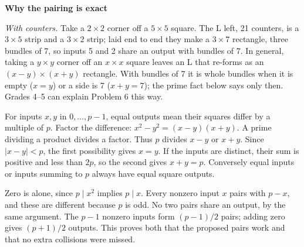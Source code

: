 \documentclass[11pt]{article}
\newcommand{\sub}[1]{\par\textbf{#1}\par}
\begin{document}
\sub{Why the pairing is exact}
\noindent\begin{minipage}[c]{0.6\linewidth}
\emph{With counters.} Take a $2\times2$ corner off a $5\times5$ square. The L left, 21 counters, is a $3\times5$ strip and a $3\times2$ strip; laid end to end they make a $3\times7$ rectangle, three bundles of 7, so inputs 5 and 2 share an output with bundles of 7. In general, taking a $y\times y$ corner off an $x\times x$ square leaves an L that re-forms as an $(x-y)\times(x+y)$ rectangle. With bundles of 7 it is whole bundles when it is empty ($x=y$) or a side is 7 ($x+y=7$); the prime fact below says only then. Grades 4--5 can explain Problem 6 this way.
\end{minipage}\hfill
\begin{minipage}[c]{0.37\linewidth}\centering
{}
\end{minipage}

For inputs $x,y$ in $0,\ldots,p-1$, equal outputs mean their squares differ by a multiple of $p$. Factor the difference: $x^2-y^2=(x-y)(x+y)$. A prime dividing a product divides a factor. Thus $p$ divides $x-y$ or $x+y$. Since $|x-y|<p$, the first possibility gives $x=y$. If the inputs are distinct, their sum is positive and less than $2p$, so the second gives $x+y=p$. Conversely equal inputs or inputs summing to $p$ always have equal square outputs.

Zero is alone, since $p\mid x^2$ implies $p\mid x$. Every nonzero input $x$ pairs with $p-x$, and these are different because $p$ is odd. No two pairs share an output, by the same argument. The $p-1$ nonzero inputs form $(p-1)/2$ pairs; adding zero gives $(p+1)/2$ outputs. This proves both that the proposed pairs work and that no extra collisions were missed.
\end{document}
